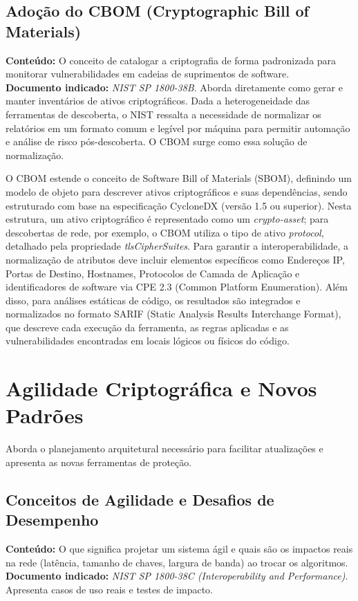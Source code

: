     \subsection{Adoção do CBOM (Cryptographic Bill of Materials)}
    \textbf{Conteúdo:} O conceito de catalogar a criptografia de forma padronizada para monitorar vulnerabilidades em cadeias de suprimentos de software.\\
    \textbf{Documento indicado:} \textit{NIST SP 1800-38B}. Aborda diretamente como gerar e manter inventários de ativos criptográficos.
    Dada a heterogeneidade das ferramentas de descoberta, o NIST ressalta a necessidade de normalizar os relatórios em um formato comum e legível por máquina para permitir automação e análise de risco pós-descoberta. O CBOM surge como essa solução de normalização.\cite{nistSP180038B}

    O CBOM estende o conceito de Software Bill of Materials (SBOM), definindo um modelo de objeto para descrever ativos criptográficos e suas dependências, sendo estruturado com base na especificação CycloneDX (versão 1.5 ou superior). Nesta estrutura, um ativo criptográfico é representado como um \textit{crypto-asset}; para descobertas de rede, por exemplo, o CBOM utiliza o tipo de ativo \textit{protocol}, detalhado pela propriedade \textit{tlsCipherSuites}. Para garantir a interoperabilidade, a normalização de atributos deve incluir elementos específicos como Endereços IP, Portas de Destino, Hostnames, Protocolos de Camada de Aplicação e identificadores de software via CPE 2.3 (Common Platform Enumeration). Além disso, para análises estáticas de código, os resultados são integrados e normalizados no formato SARIF (Static Analysis Results Interchange Format), que descreve cada execução da ferramenta, as regras aplicadas e as vulnerabilidades encontradas em locais lógicos ou físicos do código.\cite{nistSP180038B}
            
\section{Agilidade Criptográfica e Novos Padrões}
Aborda o planejamento arquitetural necessário para facilitar atualizações e apresenta as novas ferramentas de proteção.

\subsection{Conceitos de Agilidade e Desafios de Desempenho}
\textbf{Conteúdo:} O que significa projetar um sistema ágil e quais são os impactos reais na rede (latência, tamanho de chaves, largura de banda) ao trocar os algoritmos.\\
\textbf{Documento indicado:} \textit{NIST SP 1800-38C (Interoperability and Performance)}. Apresenta casos de uso reais e testes de impacto.

